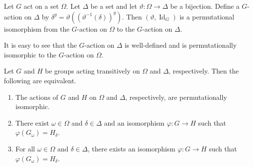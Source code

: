 \begin{proposition}
	Let $G$ act on a set $\Omega$. Let $\Delta$ be a set and let $\vartheta: \Omega \to \Delta$ be a bijection. Define a $G$-action on $\Delta$ by $\delta^g = \vartheta((\vartheta^{-1}(\delta))^g)$. Then $(\vartheta, \operatorname{Id}_G)$ is a permutational isomorphism from the $G$-action on $\Omega$ to the $G$-action on $\Delta$.
\end{proposition}

\begin{sketch}
	It is easy to see that the $G$-action on $\Delta$ is well-defined and is permutationally isomorphic to the $G$-action on $\Omega$. 
\end{sketch}


\begin{proposition}
	Let $G $ and $H$ be groups acting transitively on $\Omega $ and $\Delta $, respectively. Then the following are equivalent.
	\begin{enumerate}[(1)]
		\item The actions of $G $ and $H$ on $\Omega $ and $\Delta $, respectively, are permutationally isomorphic.
		\item There exist $\omega \in \Omega $ and $\delta \in \Delta $ and an isomorphism $\varphi: G  \to H$ such that $\varphi(G_{\omega}) = H_{\delta}$.
		\item For all $\omega \in \Omega $ and $\delta \in \Delta $, there exists an isomorphism $\varphi: G  \to H$ such that $\varphi(G_{\omega}) = H_{\delta}$.
	\end{enumerate}
\end{proposition}

